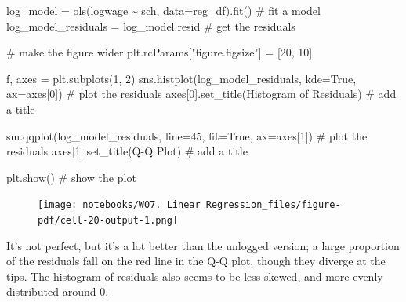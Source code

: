 \documentclass[
  letterpaper,
  DIV=11,
  numbers=noendperiod]{scrreprt}
\newenvironment{Shaded}{\begin{snugshade}}{\end{snugshade}}
\newcommand{\CommentTok}[1]{\textcolor[rgb]{0.37,0.37,0.37}{#1}}
\newcommand{\DecValTok}[1]{\textcolor[rgb]{0.68,0.00,0.00}{#1}}
\newcommand{\NormalTok}[1]{\textcolor[rgb]{0.00,0.23,0.31}{#1}}
\newcommand{\OperatorTok}[1]{\textcolor[rgb]{0.37,0.37,0.37}{#1}}
\newcommand{\StringTok}[1]{\textcolor[rgb]{0.13,0.47,0.30}{#1}}
\newcommand{\VariableTok}[1]{\textcolor[rgb]{0.07,0.07,0.07}{#1}}
\begin{document}
\begin{Shaded}
\begin{Highlighting}[]
\NormalTok{log\_model }\OperatorTok{=}\NormalTok{ ols(}\StringTok{\textquotesingle{}logwage \textasciitilde{}  sch\textquotesingle{}}\NormalTok{, data}\OperatorTok{=}\NormalTok{reg\_df).fit()  }\CommentTok{\# fit a model}
\NormalTok{log\_model\_residuals }\OperatorTok{=}\NormalTok{ log\_model.resid }\CommentTok{\# get the residuals}

\CommentTok{\# make the figure wider}
\NormalTok{plt.rcParams[}\StringTok{"figure.figsize"}\NormalTok{] }\OperatorTok{=}\NormalTok{ [}\DecValTok{20}\NormalTok{, }\DecValTok{10}\NormalTok{]}

\NormalTok{f, axes }\OperatorTok{=}\NormalTok{ plt.subplots(}\DecValTok{1}\NormalTok{, }\DecValTok{2}\NormalTok{)}
\NormalTok{sns.histplot(log\_model\_residuals, kde}\OperatorTok{=}\VariableTok{True}\NormalTok{, ax}\OperatorTok{=}\NormalTok{axes[}\DecValTok{0}\NormalTok{]) }\CommentTok{\# plot the residuals}
\NormalTok{axes[}\DecValTok{0}\NormalTok{].set\_title(}\StringTok{\textquotesingle{}Histogram of Residuals\textquotesingle{}}\NormalTok{) }\CommentTok{\# add a title}

\NormalTok{sm.qqplot(log\_model\_residuals, line}\OperatorTok{=}\StringTok{\textquotesingle{}45\textquotesingle{}}\NormalTok{, fit}\OperatorTok{=}\VariableTok{True}\NormalTok{,  ax}\OperatorTok{=}\NormalTok{axes[}\DecValTok{1}\NormalTok{]) }\CommentTok{\# plot the residuals}
\NormalTok{axes[}\DecValTok{1}\NormalTok{].set\_title(}\StringTok{\textquotesingle{}Q{-}Q Plot\textquotesingle{}}\NormalTok{) }\CommentTok{\# add a title}

\NormalTok{plt.show() }\CommentTok{\# show the plot}
\end{Highlighting}
\end{Shaded}

\begin{figure}[H]

{\centering \texttt{[image: notebooks/W07. Linear Regression\_files/figure-pdf/cell-20-output-1.png]}

}

\end{figure}

It's not perfect, but it's a lot better than the unlogged version; a
large proportion of the residuals fall on the red line in the Q-Q plot,
though they diverge at the tips. The histogram of residuals also seems
to be less skewed, and more evenly distributed around 0.
\end{document}
